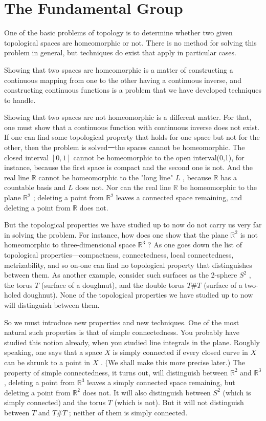\chapter{The Fundamental Group}

One of the basic problems of topology is to determine whether two given topological spaces are homeomorphic or not. There is no method for solving this problem in general, but techniques do exist that apply in particular cases.

Showing that two spaces are homeomorphic is a matter of constructing a continuous mapping from one to the other having a continuous inverse, and constructing continuous functions is a problem that we have developed techniques to handle.

Showing that two spaces are not homeomorphic is a different matter. For that, one must show that a continuous function with continuous inverse does not exist. If one can find some topological property that holds for one space but not for the other, then the problem is solved一the spaces cannot be homeomorphic. The closed interval \(\left\lbrack  {0,1}\right\rbrack\) cannot be homeomorphic to the open interval(0,1), for instance, because the first space is compact and the second one is not. And the real line \(\mathbb{R}\) cannot be homeomorphic to the "long line" \(L\) , because \(\mathbb{R}\) has a countable basis and \(L\) does not. Nor can the real line \(\mathbb{R}\) be homeomorphic to the plane \({\mathbb{R}}^{2}\) ; deleting a point from \({\mathbb{R}}^{2}\) leaves a connected space remaining, and deleting a point from \(\mathbb{R}\) does not.

But the topological properties we have studied up to now do not carry us very far in solving the problem. For instance, how does one show that the plane \({\mathbb{R}}^{2}\) is not homeomorphic to three-dimensional space \({\mathbb{R}}^{3}\) ? As one goes down the list of topological properties—compactness, connectedness, local connectedness, metrizability, and so on-one can find no topological property that distinguishes between them. As another example, consider such surfaces as the 2-sphere \({S}^{2}\) , the torus \(T\) (surface of a doughnut), and the double torus \(T\# T\) (surface of a two-holed doughnut). None of the topological properties we have studied up to now will distinguish between them.

So we must introduce new properties and new techniques. One of the most natural such properties is that of simple connectedness. You probably have studied this notion already, when you studied line integrals in the plane. Roughly speaking, one says that a space \(X\) is simply connected if every closed curve in \(X\) can be shrunk to a point in \(X\) . (We shall make this more precise later.) The property of simple connectedness, it turns out, will distinguish between \({\mathbb{R}}^{2}\) and \({\mathbb{R}}^{3}\) , deleting a point from \({\mathbb{R}}^{3}\) leaves a simply connected space remaining, but deleting a point from \({\mathbb{R}}^{2}\) does not. It will also distinguish between \({S}^{2}\) (which is simply connected) and the torus \(T\) (which is not). But it will not distinguish between \(T\) and \(T\# T\) ; neither of them is simply connected.

